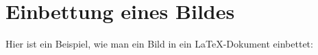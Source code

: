 \documentclass{article}
\begin{document}
	
	\section{Einbettung eines Bildes}
	
	Hier ist ein Beispiel, wie man ein Bild in ein LaTeX-Dokument einbettet:
	
	
	
	
\end{document}
